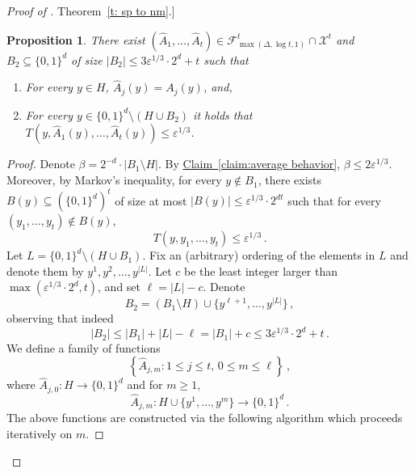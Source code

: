 \documentclass[11pt]{article}
\numberwithin{equation}{section}
\newtheorem{proposition}[theorem]{Proposition}
\theoremstyle{definition}
\theoremstyle{plain}
\newcommand{\expref}[2]{\hyperref[#2]{#1~\ref{#2}}}
\newcommand{\adv}{A}
\newcommand{\eps}{\varepsilon}
\newcommand{\nc}{\mathcal{X}}
\newcommand{\set}[1]{\left\{{#1}\right\}}
\newcommand{\abs}[1]{\left\lvert #1\right\rvert}
\newcommand{\advfampart}{\mathcal{F}}
\begin{document}
\begin{proof}[Proof of \expref{Theorem}{t: sp to nm}.]
\begin{proposition}\label{c: pi construction}
There exist $(\widehat{A}_1,\ldots,\widehat{A}_t) \in  \advfampart^t_{\max(\Delta, \log t,1)} \cap \nc^t$ and $B_2 \subseteq \{0,1\}^d$ of size $\abs{B_2} \le 3\eps^{1/3}\cdot 2^d + t$ such that
\begin{enumerate}
  \item\label{it:c1} For every $y \in H$, $\widehat{A}_j(y) = \adv_j(y)$, and,
  \item\label{it:c2} For every $y \in \{0,1\}^d \setminus (H \cup B_2)$ it holds that $T\left(y,\widehat{A}_1(y), \ldots, \widehat{A}_t(y)\right) \le \eps^{1/3}$.
\end{enumerate}
\end{proposition}

\begin{proof}

Denote $\beta = 2^{-d} \cdot |B_1\setminus H|$. 
By \expref{Claim}{claim:average behavior}, $\beta \leq 2\eps^{1/3}$. Moreover, by Markov's inequality, for every $y \notin B_1$, there exists $B(y) \subseteq (\{0,1\}^d)^t$ of size at most $\abs{B(y)} \leq  \eps^{1/3} \cdot 2^{dt}$ such that for every $(y_1,\ldots,y_t) \notin B(y)$, \[T(y,y_1,\ldots,y_t) \le \eps^{1/3}\,.\]
Let $L = \{0,1\}^d \setminus (H \cup B_1)$. Fix an (arbitrary) ordering of the elements in $L$ and denote them by $y^1,y^2,\ldots,y^{\abs{L}}$. Let $c$ be the least integer larger than $\max(\eps^{1/3} \cdot 2^d, t)$, and set $\ell = \abs{L} - c$. Denote \[B_2 = (B_1\setminus H) \cup \{y^{\ell+1},\ldots, y^{\abs{L}}\}\,,\] observing that indeed
\[
|B_2| \le |B_1| + |L|-\ell = |B_1| +c \le 3\eps^{1/3}\cdot 2^d + t\,.
\]
%
We define a family of functions
\[
\set{\widehat{A}_{j,m} : 1 \le j \le t,\, 0 \le m \le \ell}\,,
\]
where $\widehat{A}_{j,0} \colon H  \rightarrow \{0,1\}^d$ and for $m \ge 1$,
\[\widehat{A}_{j,m} \colon H \cup \{y^1,\ldots, y^{m}\} \rightarrow \{0,1\}^d\,.\]
The above functions are constructed via the following algorithm which proceeds iteratively on $m$.%

%

\end{proof}
\end{proof}
\end{document}
